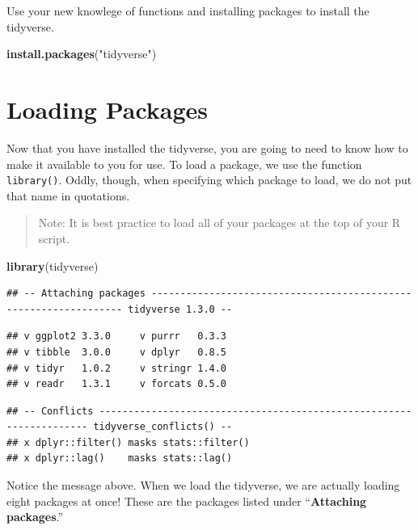 \documentclass[
]{book}
\newenvironment{Shaded}{\begin{snugshade}}{\end{snugshade}}
\newcommand{\KeywordTok}[1]{\textcolor[rgb]{0.13,0.29,0.53}{\textbf{#1}}}
\newcommand{\NormalTok}[1]{#1}
\newcommand{\StringTok}[1]{\textcolor[rgb]{0.31,0.60,0.02}{#1}}
\begin{document}
Use your new knowlege of functions and installing packages to install the tidyverse.

\begin{Shaded}
\begin{Highlighting}[]
\KeywordTok{install.packages}\NormalTok{(}\StringTok{"tidyverse"}\NormalTok{)}
\end{Highlighting}
\end{Shaded}

\hypertarget{loading-packages}{%
\section{Loading Packages}\label{loading-packages}}

Now that you have installed the tidyverse, you are going to need to know how to make it available to you for use. To load a package, we use the function \texttt{library()}. Oddly, though, when specifying which package to load, we do not put that name in quotations.

\begin{quote}
Note: It is best practice to load all of your packages at the top of your R script.
\end{quote}

\begin{Shaded}
\begin{Highlighting}[]
\KeywordTok{library}\NormalTok{(tidyverse)}
\end{Highlighting}
\end{Shaded}

\begin{verbatim}
## -- Attaching packages ----------------------------------------------------------------- tidyverse 1.3.0 --
\end{verbatim}

\begin{verbatim}
## v ggplot2 3.3.0     v purrr   0.3.3
## v tibble  3.0.0     v dplyr   0.8.5
## v tidyr   1.0.2     v stringr 1.4.0
## v readr   1.3.1     v forcats 0.5.0
\end{verbatim}

\begin{verbatim}
## -- Conflicts -------------------------------------------------------------------- tidyverse_conflicts() --
## x dplyr::filter() masks stats::filter()
## x dplyr::lag()    masks stats::lag()
\end{verbatim}

Notice the message above. When we load the tidyverse, we are actually loading eight packages at once! These are the packages listed under ``\textbf{Attaching packages}.''
\end{document}

